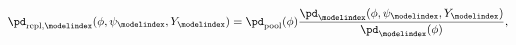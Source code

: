 \begin{equation}
  \pd_{\text{repl}, \modelindex}(\phi, \psi_{\modelindex}, Y_{\modelindex}) =
  \pd_{\text{pool}}(\phi)
  \frac{
    \pd_{\modelindex}(\phi, \psi_{\modelindex}, Y_{\modelindex})
  } {
    \pd_{\modelindex}(\phi)
  },
  \label{eqn:marginal-replacement}
\end{equation}